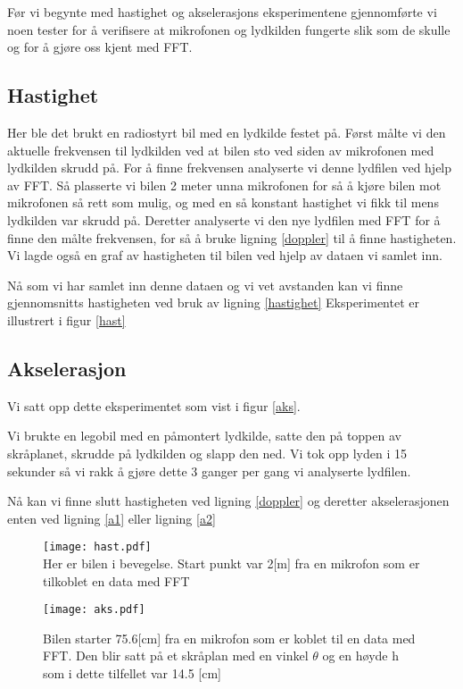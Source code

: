 \documentclass[norsk,a4paper,12pt]{article}
\begin{document}
Før vi begynte med hastighet og akselerasjons eksperimentene gjennomførte vi noen tester for å verifisere at mikrofonen og lydkilden fungerte slik som de skulle og for å gjøre oss kjent med FFT.

\subsection{Hastighet}

Her ble det brukt en radiostyrt bil med en lydkilde festet på. Først målte vi den aktuelle frekvensen til lydkilden ved at bilen sto ved siden av mikrofonen med lydkilden skrudd på. For å finne frekvensen analyserte vi denne lydfilen ved hjelp av FFT. Så plasserte vi bilen 2 meter unna mikrofonen for så å kjøre bilen mot mikrofonen så rett som mulig, og med en så konstant hastighet vi fikk til mens lydkilden var skrudd på. Deretter analyserte vi den nye lydfilen med FFT for å finne den målte frekvensen, for så å bruke ligning \ref{doppler} til å finne hastigheten. Vi lagde også en graf av hastigheten til bilen ved hjelp av dataen vi samlet inn. 

Nå som vi har samlet inn denne dataen og vi vet avstanden kan vi finne gjennomsnitts hastigheten ved bruk av ligning \ref{hastighet}
Eksperimentet er illustrert i figur \vref{hast}


\subsection{Akselerasjon}



Vi satt opp dette eksperimentet som vist i figur \vref{aks}. 


Vi brukte en legobil med en påmontert lydkilde, satte den på toppen av skråplanet, skrudde på lydkilden og slapp den ned. Vi tok opp lyden i 15 sekunder så vi rakk å gjøre dette 3 ganger per gang vi analyserte lydfilen. 

Nå kan vi finne slutt hastigheten ved ligning \ref{doppler} og deretter akselerasjonen enten ved ligning \ref{a1} eller ligning \ref{a2}

\begin{figure}
	\begin{minipage}{\linewidth}
	\centering
  	\texttt{[image: hast.pdf]}\\
  	\caption[Skisse av hastighet eksperimentet]{Her er bilen i bevegelse. Start punkt var 2[m] fra en 
	mikrofon som er tilkoblet en data med FFT}
  	\label{hast}
  	\end{minipage}
	\hspace{0.5cm}
	\begin{minipage}{\linewidth}
	\centering
  	\texttt{[image: aks.pdf]}\\
  	\caption[Skisse av akselerasjon eksperimentet]{Bilen starter 75.6[cm] fra en mikrofon som er 
	koblet til en data med FFT. Den blir satt på et skråplan med en vinkel $\theta$ og en høyde h 
	som i dette tilfellet var 14.5 [cm]}
  	\label{aks}
  	\end{minipage}
\end{figure}
\end{document}
